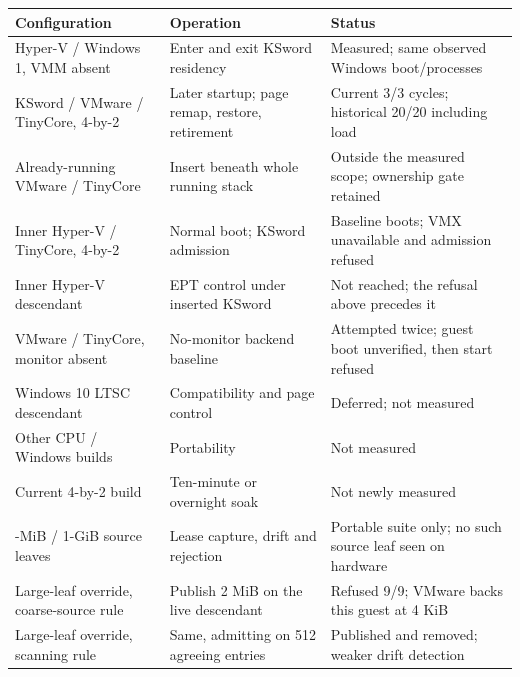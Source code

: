 \newpage
\begin{center}\small
\captionsetup{hypcap=false}
\label{tab:matrix}
\begin{tabularx}{\linewidth}{@{}>{\raggedright\arraybackslash}p{3.5cm}>{\raggedright\arraybackslash}p{4.2cm}>{\raggedright\arraybackslash}X@{}}
\toprule
Configuration & Operation & Status \\
\midrule
Hyper-V / Windows 1, VMM absent & Enter and exit KSword residency & Measured; same observed Windows boot/processes \\
KSword / VMware / TinyCore, 4-by-2 & Later startup; page remap, restore, retirement & Current 3/3 cycles; historical 20/20 including load \\
Already-running VMware / TinyCore & Insert beneath whole running stack & Outside the measured scope; ownership gate retained \\
Inner Hyper-V / TinyCore, 4-by-2 & Normal boot; KSword admission & Baseline boots; VMX unavailable and admission refused \\
Inner Hyper-V descendant & EPT control under inserted KSword & Not reached; the refusal above precedes it \\
VMware / TinyCore, monitor absent & No-monitor backend baseline & Attempted twice; guest boot unverified, then start refused \\
Windows 10 LTSC descendant & Compatibility and page control & Deferred; not measured \\
Other CPU / Windows builds & Portability & Not measured \\
Current 4-by-2 build & Ten-minute or overnight soak & Not newly measured \\
2-MiB / 1-GiB source leaves & Lease capture, drift and rejection & Portable suite only; no such source leaf seen on hardware \\
Large-leaf override, coarse-source rule & Publish 2 MiB on the live descendant & Refused 9/9; VMware backs this guest at 4 KiB \\
Large-leaf override, scanning rule & Same, admitting on 512 agreeing entries & Published and removed; weaker drift detection \\

\end{tabularx}
\end{center}
